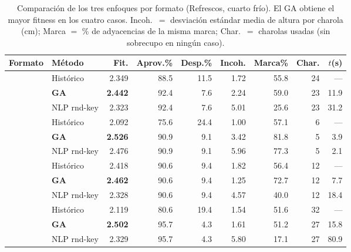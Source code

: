 \documentclass[11pt,letterpaper]{article}
\newcommand{\thead}[1]{\rowcolor{headgray}#1}
\begin{document}
\begin{table}[H]
\centering\small
\begin{tabular}{llrrrrrrr}
\toprule
\thead{\textbf{Formato}} & \textbf{M\'etodo} & \textbf{Fit.} & \textbf{Aprov.\%} &
\textbf{Desp.\%} & \textbf{Incoh.} & \textbf{Marca\%} & \textbf{Char.} &
\textbf{$t$(s)} \\
\midrule
{}
  & Hist\'orico    & 2.349 & 88.5 & 11.5 & 1.72 & 55.8 & 24 & --- \\
  & \textbf{GA} & \textbf{2.442} & 92.4 & 7.6 & 2.24 & 59.0 & 23 & 11.9 \\
  & NLP rnd-key    & 2.323 & 92.4 & 7.6 & 5.01 & 25.6 & 23 & 31.2 \\
\midrule
{}
  & Hist\'orico    & 2.092 & 75.6 & 24.4 & 1.00 & 57.1 & 6 & --- \\
  & \textbf{GA} & \textbf{2.526} & 90.9 & 9.1 & 3.42 & 81.8 & 5 & 3.9 \\
  & NLP rnd-key    & 2.476 & 90.9 & 9.1 & 5.96 & 77.3 & 5 & 2.1 \\
\midrule
{}
  & Hist\'orico    & 2.418 & 90.6 & 9.4 & 1.82 & 56.4 & 12 & --- \\
  & \textbf{GA} & \textbf{2.462} & 90.6 & 9.4 & 1.25 & 72.7 & 12 & 7.7 \\
  & NLP rnd-key    & 2.328 & 90.6 & 9.4 & 4.57 & 40.0 & 12 & 18.4 \\
\midrule
{}
  & Hist\'orico    & 2.119 & 80.6 & 19.4 & 1.54 & 51.6 & 32 & --- \\
  & \textbf{GA} & \textbf{2.502} & 95.7 & 4.3 & 1.61 & 51.2 & 27 & 15.8 \\
  & NLP rnd-key    & 2.329 & 95.7 & 4.3 & 5.80 & 17.1 & 27 & 80.9 \\
\bottomrule
\end{tabular}
\caption{Comparaci\'on de los tres enfoques por formato (Refrescos, cuarto fr\'io).
El GA obtiene el mayor fitness en los cuatro casos. Incoh.\ $=$ desviaci\'on
est\'andar media de altura por charola (cm); Marca $=$ \% de adyacencias de la misma
marca; Char.\ $=$ charolas usadas (sin sobrecupo en ning\'un caso).}
\label{tab:comp}
\end{table}
\end{document}
